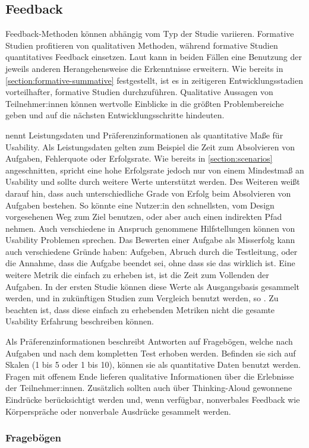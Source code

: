 \subsection{Feedback}

Feedback-Methoden können abhängig vom Typ der Studie variieren. Formative Studien profitieren von
qualitativen Methoden, während formative Studien quantitatives Feedback einsetzen. Laut
\textcite{barnumUsabilityTesting2021} kann in beiden Fällen eine Benutzung der jeweils anderen
Herangehensweise die Erkenntnisse erweitern. Wie bereits in \ref{section:formative-summative}
festgestellt, ist es in zeitigeren Entwicklungsstadien vorteilhafter, formative Studien
durchzuführen.  Qualitative Aussagen von
Teilnehmer:innen können wertvolle Einblicke in die größten Problembereiche geben und auf die
nächsten Entwicklungsschritte hindeuten.
\parencite{barnumUsabilityTesting2021}

\textcite{barnumUsabilityTesting2021} nennt Leistungsdaten und Präferenzinformationen als
quantitative Maße für Usability. Als Leistungsdaten gelten zum Beispiel die Zeit zum Absolvieren von
Aufgaben, Fehlerquote oder Erfolgsrate. Wie bereits in \ref{section:scenarios} angeschnitten,
spricht eine hohe Erfolgsrate jedoch nur von einem Mindestmaß an Usability und sollte durch weitere
Werte unterstützt werden. Des Weiteren weißt \textcite{barnumUsabilityTesting2021} darauf hin, dass
auch unterschiedliche Grade von Erfolg beim Absolvieren von Aufgaben bestehen. So könnte eine
Nutzer:in den schnellsten, vom Design vorgesehenen Weg zum Ziel benutzen, oder aber auch einen
indirekten Pfad nehmen. Auch verschiedene in Anspruch genommene Hilfstellungen können von Usability
Problemen sprechen. Das Bewerten einer Aufgabe als Misserfolg kann auch verschiedene Gründe haben:
Aufgeben, Abruch durch die Testleitung, oder die Annahme, dass die Aufgabe beendet sei, ohne dass
sie das wirklich ist. Eine weitere Metrik die einfach zu erheben ist, ist die Zeit zum Vollenden der
Aufgaben. In der ersten Studie können diese Werte als Ausgangsbasis gesammelt werden, und in
zukünftigen Studien zum Vergleich benutzt werden, so \textcite{barnumUsabilityTesting2021}. Zu
beachten ist, dass diese einfach zu erhebenden Metriken nicht die gesamte Usability Erfahrung
beschreiben können.
\parencite{barnumUsabilityTesting2021}

Als Präferenzinformationen beschreibt \textcite{barnumUsabilityTesting2021} Antworten auf
Fragebögen, welche nach Aufgaben und nach dem kompletten Test erhoben werden. Befinden sie sich auf
Skalen (1 bis 5 oder 1 bis 10), können sie als quantitative Daten benutzt werden. Fragen mit offenem
Ende lieferen qualitative Informationen über die Erlebnisse der Teilnehmer:innen. Zusätzlich sollten
auch über Thinking-Aloud gewonnene Eindrücke berücksichtigt werden und, wenn verfügbar,
nonverbales Feedback wie Körperspräche oder nonverbale Ausdrücke gesammelt werden.

\subsubsection{Fragebögen}
